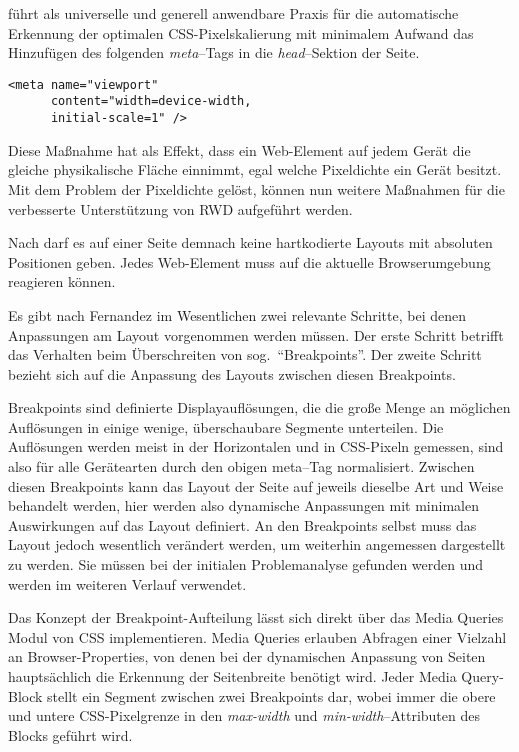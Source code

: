 \autocite{JiangResponsiveWebDesignModeAndApplication.2014} führt als universelle und generell anwendbare Praxis für die automatische Erkennung der optimalen \acs{CSS}-Pixelskalierung mit minimalem Aufwand das Hinzufügen des folgenden \emph{meta}--Tags in die \emph{head}--Sektion der Seite.

\begin{verbatim}
<meta name="viewport"
      content="width=device-width,
      initial-scale=1" />
\end{verbatim}

Diese Maßnahme hat als Effekt, dass ein Web-Element auf jedem Gerät die gleiche physikalische Fläche einnimmt, egal welche Pixeldichte ein Gerät besitzt.
Mit dem Problem der Pixeldichte gelöst, können nun weitere Maßnahmen für die verbesserte Unterstützung von \ac{RWD} aufgeführt werden.

Nach \autocite{Katajisto.CreatingSupportContent.2015} darf es auf einer Seite demnach keine hartkodierte Layouts mit absoluten Positionen geben.
Jedes Web-Element muss auf die aktuelle Browserumgebung reagieren können.

Es gibt nach Fernandez \autocite[S. 3]{MobileWebResponsiveWebdesign.Fernandez.2012} im Wesentlichen zwei relevante Schritte, bei denen Anpassungen am Layout vorgenommen werden müssen.
Der erste Schritt betrifft das Verhalten beim Überschreiten von sog.\ "`Breakpoints"'.
Der zweite Schritt bezieht sich auf die Anpassung des Layouts zwischen diesen Breakpoints.

Breakpoints sind definierte Displayauflösungen, die die große Menge an möglichen Auflösungen in einige wenige, überschaubare Segmente unterteilen.
Die Auflösungen werden meist in der Horizontalen und in \acs{CSS}-Pixeln gemessen, sind also für alle Gerätearten durch den obigen meta--Tag normalisiert.
Zwischen diesen Breakpoints kann das Layout der Seite auf jeweils dieselbe Art und Weise behandelt werden, hier werden also dynamische Anpassungen mit minimalen Auswirkungen auf das Layout definiert.
An den Breakpoints selbst muss das Layout jedoch wesentlich verändert werden, um weiterhin angemessen dargestellt zu werden.
Sie müssen bei der initialen Problemanalyse gefunden werden und werden im weiteren Verlauf verwendet.

Das Konzept der Breakpoint-Aufteilung lässt sich direkt über das Media Queries Modul von \ac{CSS} implementieren.
\autocite{JiangResponsiveWebDesignModeAndApplication.2014}
Media Queries erlauben Abfragen einer Vielzahl an Browser-Properties, von denen bei der dynamischen Anpassung von Seiten hauptsächlich die Erkennung der Seitenbreite benötigt wird.
Jeder Media Query-Block stellt ein Segment zwischen zwei Breakpoints dar, wobei immer die obere und untere \acs{CSS}-Pixelgrenze in den \emph{max-width} und \emph{min-width}--Attributen des Blocks geführt wird.

